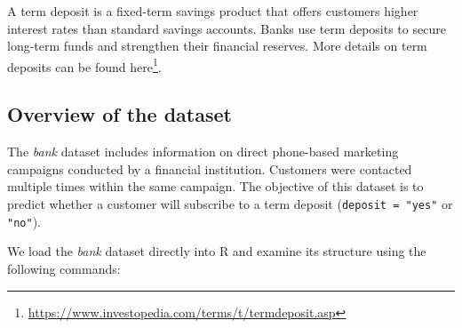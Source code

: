 \documentclass[
  11pt,
]{book}
\renewcommand{\href}[2]{#2\footnote{\url{#1}}}
\theoremstyle{definition}
\theoremstyle{definition}
\theoremstyle{definition}
\theoremstyle{definition}
\theoremstyle{remark}
\begin{document}
A term deposit is a fixed-term savings product that offers customers higher interest rates than standard savings accounts. Banks use term deposits to secure long-term funds and strengthen their financial reserves. More details on term deposits can be found \href{https://www.investopedia.com/terms/t/termdeposit.asp}{here}.

\subsection*{Overview of the dataset}\label{overview-of-the-dataset-2}


The \emph{bank} dataset includes information on direct phone-based marketing campaigns conducted by a financial institution. Customers were contacted multiple times within the same campaign. The objective of this dataset is to predict whether a customer will subscribe to a term deposit (\texttt{deposit\ =\ "yes"} or \texttt{"no"}).

We load the \emph{bank} dataset directly into R and examine its structure using the following commands:
\end{document}
